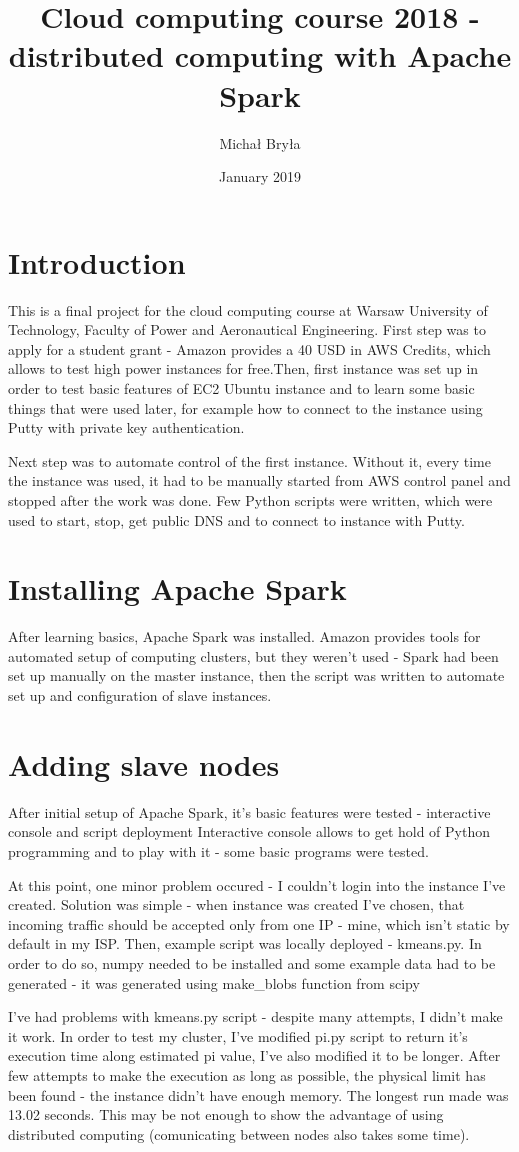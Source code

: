 \documentclass{article}
\title{Cloud computing course 2018 - distributed computing with Apache Spark}
\author{Michał Bryła}
\date{January 2019}
\begin{document}
\maketitle

\section{Introduction}
This is a final project for the cloud computing course at Warsaw University of Technology, Faculty of Power and Aeronautical Engineering. First step was to apply for a student grant - Amazon provides a 40 USD in AWS Credits, which allows to test high power instances for free.Then, first instance was set up in order to test basic features of EC2 Ubuntu instance and to learn some basic things that were used later, for example how to connect to the instance using Putty with private key authentication. \par
Next step was to automate control of the first instance. Without it, every time the instance was used, it had to be manually started from AWS control panel and stopped after the work was done. Few Python scripts were written, which were used to start, stop, get public DNS and to connect to instance with Putty.

\section{Installing Apache Spark}
After learning basics, Apache Spark was installed. Amazon provides tools for automated setup of computing clusters, but they weren't used - Spark had been set up manually on the master instance, then the script was written to automate set up and configuration of slave instances.

\section{Adding slave nodes}
After initial setup of Apache Spark, it's basic features were tested - interactive console and script deployment
Interactive console allows to get hold of Python programming and to play with it - some basic programs were tested. \par
At this point, one minor problem occured - I couldn't login into the instance I've created. Solution was simple - when instance was created I've chosen, that incoming traffic should be accepted only from one IP - mine, which isn't static by default in my ISP.
Then, example script was locally deployed - kmeans.py. In order to do so, numpy needed to be installed and some example data had to be generated - it was generated using make_blobs function from scipy \par
I've had problems with kmeans.py script - despite many attempts, I didn't make it work. In order to test my cluster, I've modified pi.py script to return it's execution time along estimated pi value, I've also modified it to be longer.
After few attempts to make the execution as long as possible, the physical limit has been found - the instance didn't have enough memory. The longest run made was 13.02 seconds. This may be not enough to show the advantage of using distributed computing (comunicating between nodes also takes some time).
\end{document}
